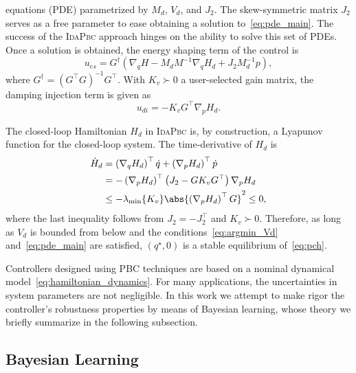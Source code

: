 equations (PDE) parametrized by $M_d$, $V_d$, and $J_2$. 
%
The skew-symmetric matrix $J_2$ serves as a free parameter to ease obtaining a
solution to~\eqref{eq:pde_main}.
%
The success of the \textsc{IdaPbc} approach hinges on the ability to solve this set of
PDEs.
%
Once a solution is obtained, the energy shaping term of the control is
%
\begin{equation}
  u_{es} = G^{\dagger} \left(\nabla_qH - M_dM^{-1} \nabla_qH_d + J_2M_d^{-1}p\right),
  \label{eq:ues}
\end{equation}
%
where $G^{\dagger} = \left(G^\top G\right)^{-1} G^\top$.
%
With $K_v \succ 0$ a user-selected gain matrix, the damping injection term is given as
%
\begin{equation}
    u_{di} = -K_v G^\top \nabla_p H_d.
    \label{eq:udi}
\end{equation}

\begin{prop}
  The closed-loop Hamiltonian $H_d$ in \textsc{IdaPbc} is, by construction, a Lyapunov
  function for the closed-loop system. The time-derivative of $H_d$ is
  \begin{align*}
      \dot{H}_d 
      &= \left( \nabla_{q} H_d \right)^\top \dot{q} + \left( \nabla_p H_d \right)^\top \dot{p} \\
      &= -\left( \nabla_{p} H_d \right)^\top \left(J_2 - G K_v G^\top\right) \nabla_p H_d \\
      &\leq -\lambda_{\textrm{min}} \{ K_v \} \abs{ \left( \nabla_p H_d \right)^\top G }^2 \leq 0,
  \end{align*}
  where the last inequality follows from $J_2 = -J_2^\top$ and $K_v \succ 0$.
  Therefore, as long as $V_d$ is bounded from below and the
  conditions~\eqref{eq:argmin_Vd} and~\eqref{eq:pde_main} are satisfied,
  $(q^\star, 0)$ is a stable equilibrium of~\eqref{eq:pch}.
  \label{prop:lyapunov}
\end{prop}



Controllers designed using PBC techniques are based on a nominal
dynamical model~\eqref{eq:hamiltonian_dynamics}. 
%
For many applications, the uncertainties in system parameters are not
negligible. 
%
In this work we attempt to make rigor the controller's robustness properties by
means of Bayesian learning, whose theory we briefly summarize in the following
subsection.


\subsection{Bayesian Learning}
\label{ssec:bays}

